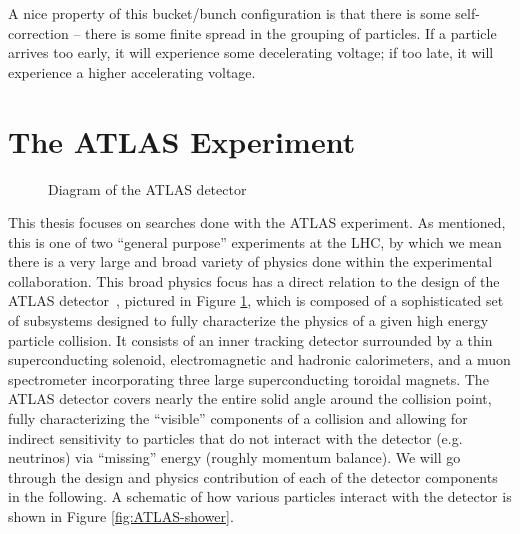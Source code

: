 A nice property of this bucket/bunch configuration is that there is some self-correction -- there is 
some finite spread in the grouping of particles. If a particle arrives too early, it will experience some 
decelerating voltage; if too late, it will experience a higher accelerating voltage.


\section{The ATLAS Experiment}
\label{sec:ATLAS}

\begin{figure}[ht]
\centering
{}
\caption{Diagram of the ATLAS detector \cite{DetectorImage} \label{fig:ATLAS-det}}
\end{figure}

This thesis focuses on searches done with the ATLAS experiment. As mentioned, this is 
one of two ``general purpose'' experiments at the LHC, by which we mean there is a 
very large and broad variety of physics done within the experimental collaboration. 
This broad physics focus has a direct relation to the design of the ATLAS detector~\cite{PERF-2007-01}, pictured 
in Figure \ref{fig:ATLAS-det}, which is composed of a sophisticated set of subsystems designed 
to fully characterize the physics of a given high energy particle collision. It consists of an inner 
tracking detector surrounded by a thin superconducting solenoid, electromagnetic and hadronic calorimeters,
and a muon spectrometer incorporating three large superconducting toroidal magnets. The ATLAS detector 
covers nearly the entire solid angle around the collision point, fully characterizing the ``visible'' 
components of a collision and allowing for indirect sensitivity to particles that do not interact with the detector 
(e.g. neutrinos) via ``missing'' energy (roughly momentum balance). We will go through the design and physics 
contribution of each of the detector components in the following. A schematic of how various particles 
interact with the detector is shown in Figure \ref{fig:ATLAS-shower}.

